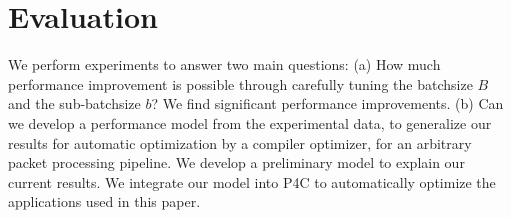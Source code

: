 \section{Evaluation}
\label{evaluation}
We perform experiments to answer two main questions: (a) How much performance improvement is possible through carefully tuning the batchsize $B$ and
the sub-batchsize $b$?  We find significant performance improvements. (b) Can we develop a performance model from the experimental data, to generalize our results for automatic
optimization by a compiler
optimizer, for an arbitrary packet processing pipeline. We develop a preliminary model to explain our current results. We integrate our model into P4C
to automatically optimize the applications used in this paper.


